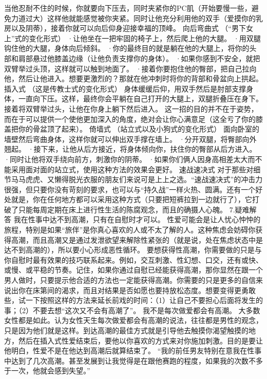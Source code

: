 \documentclass[12pt,UTF8]{ctexbook}
\begin{document}
当他忍耐不住的时候，你就要向下压去，同时夹紧你的PC肌（开始要慢一些，避免力道过大）这样他就能感觉被你夹紧。同时让他充分利用他的双手（爱摸你的乳房以及阴蒂），接着你就可以向后仰身迎接幸福的顶峰。
向后弯曲式
（“男下女上”式的变化形式）
·让他坐在一把牢固的椅子上，然后爬上他的大腿。
·用双腿钩住他的大腿，身体向后倾斜。
·你的最终目的就是躺在他的大腿上，将你的头部和肩部悬过他膝盖边缘（让他负责支撑你的身体）。
·如果你感到不安全，就把双臂举过头顶，这样就可以触到地面了。
·接着你要抱住他的臀部，把自己拉向他，然后让他进入。想要更激烈的？那就在他冲刺时将你的背部和骨盆向上拱起。
插入式
（这是传教士式的变化形式）
身体缓缓后仰，用双手然后是肘部支撑身体，一直向下压。这样，最终你会平躺在自己打开的大腿上，双腿折叠压在身下。
接着将双臂举过头，让他在你身上躺下然后进入。
这一招的目的并不在于姿势，而在于可以提供一个使他更加深入的角度，绝对会让你心满意足（这全亏了你的膝盖把你的骨盆顶了起来）。
倚墙式
（站立式以及小狗式的变化形式）
面向卧室的墙壁然后弯曲身体，这样你就可以伸出双手撑在墙上。
·分开双腿，将臀部向外翘起。
·接下来，让他从后方接近，将身体倾向你，扶住你的臀部从后方进入。
·同时让他将双手绕向前方，刺激你的阴蒂。
·如果你们俩人因身高相差太大而不能采用面对面的站立式，使用这种方法的效果会更好。
速战速决式
对于那些对细节马马虎虎、又懒得脱光衣服的朋友们来说可是上上之选。“速战速决式”的冲击力很强，但只要你没有苛刻的要求，也可以与“持久战”一样火热、圆满。还有一个好处就是，你在任何地方都可以采用这种方式（只要把短裤拉到一边就行了），它打破了只能每周定期在床上进行性生活的陈腐观念，而且的确摄人心魄。
7.疑难解答
我在性事中达不到高潮，只有在自慰时才可以。
性爱可能会是让人忧心忡忡的旅程，特别是如果“旅伴”是你真心喜欢的人或不太了解的人。这种焦虑会妨碍你获得高潮，而且高潮又是通过发泄欲望来解除性紧张的（就是说，处在焦虑状态中是达不到高潮的），所以要小心形成恶性循环。
要想获得性高潮，你需要做的只是与你自慰时最有效果的技巧联系起来。例如，交互刺激、性幻想、口交，还有或快、或慢、或平稳的节奏。记住，如果你通过自慰已经能获得高潮，那你显然在跟一个男人做时，只要提示他合适的方法也一定能获得高潮。你需要的只是更多的自信来说出你在床第间的渴求，而且对结果是否如愿也要持放松态度。想要变得更勇敢些，试一下按照这样的方法来延长前戏的时间：（1）让自己不要担心后面将发生的事；（2）不要去想“这次又不会有高潮了”。
我不是每次做爱都会有高潮。
大多数女性都是如此。认为女性天生每次做爱都会有高潮的说法，往往都是男性的观念，只是因为他们就是这样。到达高潮的最佳方式就是引导他去触摸你渴望触摸的地方，然后在插入式性爱结束后，要他以你喜欢的方式来对你施加刺激。目的是要让他明白，性爱不是在他达到高潮后就算结束了。
“我的前任男友特别在意我在性事中达到了几次高潮。甚至发展到让我觉得是在跟他赛跑的程度，如果我的次数不多于一次，他就会感到失望。”
\end{document}
